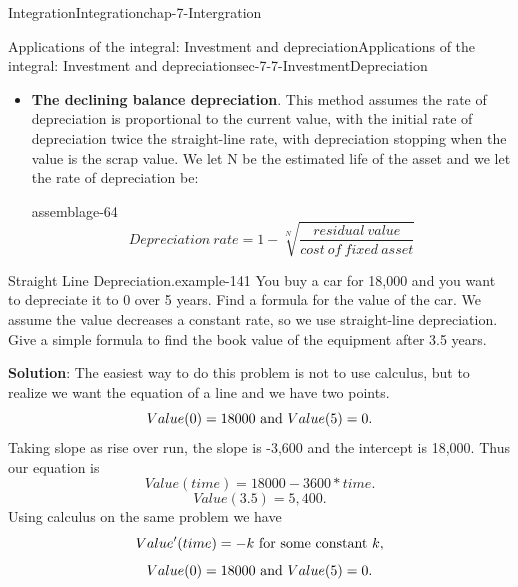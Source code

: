 \documentclass[oneside,10pt,]{book}
\newcommand{\terminology}[1]{\textbf{#1}}
\numberwithin{equation}{section}
\begin{document}
\begin{chapterptx}{Integration}{}{Integration}{}{}{chap-7-Intergration}
\begin{sectionptx}{Applications of the integral: Investment and depreciation}{}{Applications of the integral: Investment and depreciation}{}{}{sec-7-7-InvestmentDepreciation}
\begin{itemize}[label=\textbullet]
\begin{assemblage}{}{assemblage-63}
\hypertarget{p-3031}{}%
%
\begin{equation*}
V' (t)= -k (EL-t)
\end{equation*}
%
\end{assemblage}
\item{}\hypertarget{p-3032}{}%
\terminology{The declining balance depreciation}.  This method assumes the rate of depreciation is proportional to the current value, with the initial rate of depreciation twice the straight-line rate, with depreciation stopping when the value is the scrap value. We let N be the estimated life of the asset and we let the rate of depreciation be:%
\begin{assemblage}{}{assemblage-64}%
\hypertarget{p-3033}{}%
%
\begin{equation*}
Depreciation\ rate=1- \sqrt[N]{
\frac{residual\ value}{cost\ of\ fixed\ asset}}
\end{equation*}
%
\end{assemblage}
\end{itemize}
\begin{example}{Straight Line Depreciation.}{example-141}%
\hypertarget{p-3034}{}%
You buy a car for \textdollar{}18,000 and you want to depreciate it to \textdollar{}0 over 5 years. Find a formula for the value of the car. We assume the value decreases a constant rate, so we use straight-line depreciation.  Give a simple formula to find the book value of the equipment after 3.5 years.%
\par
\hypertarget{p-3035}{}%
\terminology{Solution}: The easiest way to do this problem is not to use calculus, but to realize we want the equation of a line and we have two points.%
%
\begin{equation*}
Value(0)=18000 \hbox{ and } Value(5)=0.
\end{equation*}
\hypertarget{p-3036}{}%
Taking slope as rise over run, the slope is -3,600 and the intercept is 18,000.  Thus our equation is%
%
\begin{equation*}
Value(time)=18000-3600*time.
\end{equation*}
%
\begin{equation*}
Value(3.5)=5,400.
\end{equation*}
\hypertarget{p-3037}{}%
Using calculus on the same problem we have%
%
\begin{equation*}
Value' (time)=-k\hbox{ for some constant }k, 
\end{equation*}
%
\begin{equation*}
Value(0)=18000\hbox{ and } Value(5)=0.
\end{equation*}

\end{example}
\end{sectionptx}
\end{chapterptx}
\end{document}

